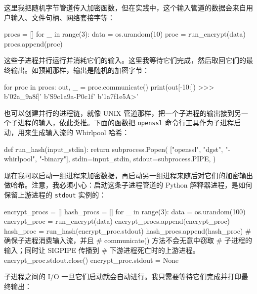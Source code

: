 这里我把随机字节管道传入加密函数，但在实践中，这个输入管道的数据会来自用户输入、文件句柄、网络套接字等：

\begin{codebox}[python]
procs = []
for _ in range(3):
    data = os.urandom(10)
    proc = run_encrypt(data)
    procs.append(proc)
\end{codebox}

这些子进程并行运行并消耗它们的输入。这里我等待它们完成，然后取回它们的最终输出。如预期那样，输出是随机的加密字节：

\begin{codebox}[python]
for proc in procs:
    out, _ = proc.communicate()
    print(out[-10:])
>>>
b'\x02a_\x9a\x8f|'
b'S\x9c\x1a\x9a-P\x0c\x1f'
b'\x1a\x7f\x1e\xbf\xac\xe5A>\xdd'
\end{codebox}

也可以创建并行的进程链，就像 UNIX 管道那样，把一个子进程的输出接到另一个子进程的输入，依此类推。下面的函数把 \texttt{openssl} 命令行工具作为子进程启动，用来生成输入流的 Whirlpool 哈希：

\begin{codebox}[python]
def run_hash(input_stdin):
    return subprocess.Popen(
        ["openssl", "dgst", "-whirlpool", "-binary"],
        stdin=input_stdin,
        stdout=subprocess.PIPE,
    )
\end{codebox}

现在我可以启动一组进程来加密数据，再启动另一组进程来随后对它们的加密输出做哈希。注意，我必须小心：启动这条子进程管道的 Python 解释器进程，是如何保留上游进程的 \texttt{stdout} 实例的：

\begin{codebox}[python]
encrypt_procs = []
hash_procs = []
for _ in range(3):
    data = os.urandom(100)
    encrypt_proc = run_encrypt(data)
    encrypt_procs.append(encrypt_proc)
    hash_proc = run_hash(encrypt_proc.stdout)
    hash_procs.append(hash_proc)
    # 确保子进程消费输入流，并且
    # communicate() 方法不会无意中窃取
    # 子进程的输入；同时让 SIGPIPE 传播到
    # 下游进程死亡时的上游进程。
    encrypt_proc.stdout.close()
    encrypt_proc.stdout = None
\end{codebox}

子进程之间的 I/O 一旦它们启动就会自动进行。我只需要等待它们完成并打印最终输出：



